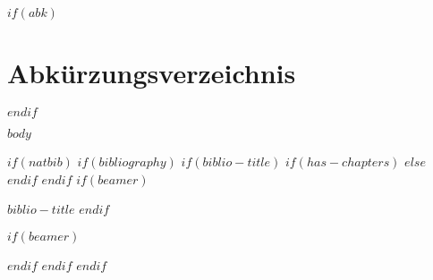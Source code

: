 \documentclass[
    12pt,
    a4paper,
    $if(lang)$
        $babel-lang$,
    $endif$
    bibliography=totocnumbered,
    listof=totocnumbered
]{scrartcl}
\begin{document}
$if(abk)$
\section{Abkürzungsverzeichnis}
\begin{acronym}[OSGi] 						%
	\setlength{\itemsep}{-\parsep} 			%
\end{acronym}
\newpage
$endif$

\renewcommand{\sectionmark}[1]{\markright{#1}}
\renewcommand{\subsectionmark}[1]{}
\renewcommand{\subsubsectionmark}[1]{}
\rhead{} %

\onehalfspacing
\renewcommand{\thesection}{\arabic{section}}
\renewcommand{\theHsection}{\arabic{section}}
\setcounter{section}{0}
\setcounter{page}{1}



$body$


$if(natbib)$
    $if(bibliography)$
        $if(biblio-title)$
            $if(has-chapters)$
\renewcommand\bibname{$biblio-title$}
            $else$
\renewcommand\refname{$biblio-title$}
            $endif$
        $endif$
        $if(beamer)$
\begin{frame}[allowframebreaks]{$biblio-title$}
  \bibliographytrue
        $endif$
  
        $if(beamer)$
\end{frame}
        $endif$
    $endif$
$endif$
\end{document}
